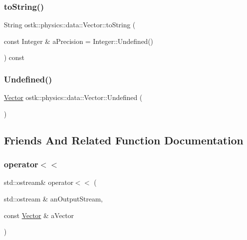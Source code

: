 \subsubsection{\texorpdfstring{to\+String()}{toString()}}
{\footnotesize\ttfamily String ostk\+::physics\+::data\+::\+Vector\+::to\+String (\begin{DoxyParamCaption}\item[{const Integer \&}]{a\+Precision = {\ttfamily Integer\+:\+:Undefined()} }\end{DoxyParamCaption}) const}

\mbox{\label{classostk_1_1physics_1_1data_1_1_vector_afb204c378708fdd162844a348da32db7}} 
\subsubsection{\texorpdfstring{Undefined()}{Undefined()}}
{\footnotesize\ttfamily \hyperlink{classostk_1_1physics_1_1data_1_1_vector}{Vector} ostk\+::physics\+::data\+::\+Vector\+::\+Undefined (\begin{DoxyParamCaption}{ }\end{DoxyParamCaption})\hspace{0.3cm}{\ttfamily [static]}}



\subsection{Friends And Related Function Documentation}
\mbox{\label{classostk_1_1physics_1_1data_1_1_vector_a2f1253dbad20965d2209456421eabf71}} 
\subsubsection{\texorpdfstring{operator$<$$<$}{operator<<}}
{\footnotesize\ttfamily std\+::ostream\& operator$<$$<$ (\begin{DoxyParamCaption}\item[{std\+::ostream \&}]{an\+Output\+Stream,  }\item[{const \hyperlink{classostk_1_1physics_1_1data_1_1_vector}{Vector} \&}]{a\+Vector }\end{DoxyParamCaption})\hspace{0.3cm}{\ttfamily [friend]}}




